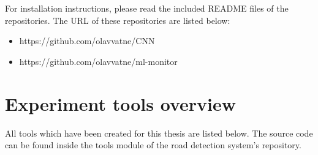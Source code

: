 For installation instructions, please read the included README files of the repositories. The URL of these repositories are listed below:

\begin{itemize}
\item https://github.com/olavvatne/CNN
\item https://github.com/olavvatne/ml-monitor
\end{itemize} 

\section{Experiment tools overview}
\label{app:tools}
All tools which have been created for this thesis are listed below. The source code can be found inside the tools module of the road detection system's repository.
